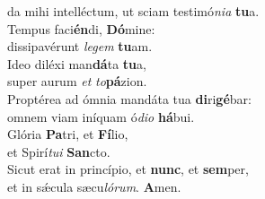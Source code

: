 \oddverse da mihi intelléctum, ut sciam testimó\textit{ni}\textit{a} \textbf{tu}a.\\
\evenverse Tempus faci\textbf{én}di, \textbf{Dó}mine:~\*\\
\evenverse dissipavérunt \textit{le}\textit{gem} \textbf{tu}am.\\
\oddverse Ideo diléxi man\textbf{dá}ta \textbf{tu}a,~\*\\
\oddverse super aurum \textit{et} \textit{to}\textbf{pá}zion.\\
\evenverse Proptérea ad ómnia mandáta tua \textbf{di}ri\textbf{gé}bar:~\*\\
\evenverse omnem viam iníquam ó\textit{di}\textit{o} \textbf{há}bui.\\
\oddverse Glória \textbf{Pa}tri, et \textbf{Fí}lio,~\*\\
\oddverse et Spirí\textit{tu}\textit{i} \textbf{San}cto.\\
\evenverse Sicut erat in princípio, et \textbf{nunc}, et \textbf{sem}per,~\*\\
\evenverse et in sǽcula sæcu\textit{ló}\textit{rum}. \textbf{A}men.\\
